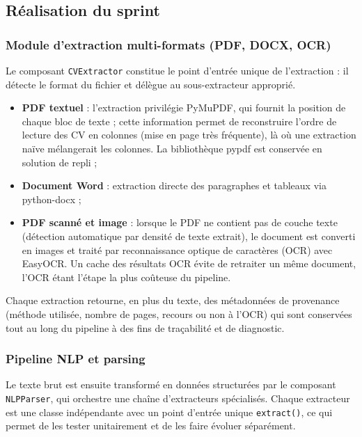\documentclass[12pt,a4paper]{report}
\begin{document}
\subsection{Réalisation du sprint}

\subsubsection{Module d'extraction multi-formats (PDF, DOCX, OCR)}

Le composant \texttt{CVExtractor} constitue le point d'entrée unique de l'extraction : il détecte le format du fichier et délègue au sous-extracteur approprié.

\begin{itemize}
  \item \textbf{PDF textuel} : l'extraction privilégie PyMuPDF, qui fournit la position de chaque bloc de texte ; cette information permet de reconstruire l'ordre de lecture des CV en colonnes (mise en page très fréquente), là où une extraction naïve mélangerait les colonnes. La bibliothèque pypdf est conservée en solution de repli ;
  \item \textbf{Document Word} : extraction directe des paragraphes et tableaux via python-docx ;
  \item \textbf{PDF scanné et image} : lorsque le PDF ne contient pas de couche texte (détection automatique par densité de texte extrait), le document est converti en images et traité par reconnaissance optique de caractères (OCR) avec EasyOCR. Un cache des résultats OCR évite de retraiter un même document, l'OCR étant l'étape la plus coûteuse du pipeline.
\end{itemize}

Chaque extraction retourne, en plus du texte, des métadonnées de provenance (méthode utilisée, nombre de pages, recours ou non à l'OCR) qui sont conservées tout au long du pipeline à des fins de traçabilité et de diagnostic.

\subsubsection{Pipeline NLP et parsing}

Le texte brut est ensuite transformé en données structurées par le composant \texttt{NLPParser}, qui orchestre une chaîne d'extracteurs spécialisés. Chaque extracteur est une classe indépendante avec un point d'entrée unique \texttt{extract()}, ce qui permet de les tester unitairement et de les faire évoluer séparément.
\end{document}
